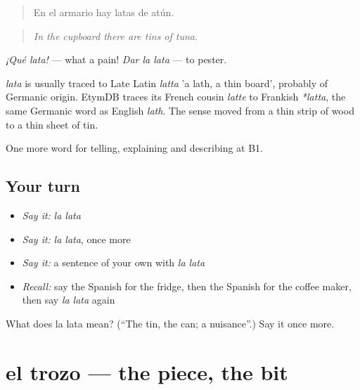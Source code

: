\begin{quote}
En el armario hay latas de atún.
\end{quote}

\begin{quote}
\emph{In the cupboard there are tins of tuna.}
\end{quote}

\emph{¡Qué lata!} — what a pain! \emph{Dar la lata} — to pester.

\begin{cousinweb}
\emph{lata} is usually traced to Late Latin \emph{latta} 'a lath, a thin board', probably of Germanic origin. EtymDB traces its French cousin \emph{latte} to Frankish \emph{*latta}, the same Germanic word as English \emph{lath}. The sense moved from a thin strip of wood to a thin sheet of tin.
\end{cousinweb}

\begin{grammarlens}[title={What you've built}]
One more word for telling, explaining and describing at B1.
\end{grammarlens}

\subsection*{Your turn}
\begin{itemize}
\raggedright
  \item \emph{Say it:} \emph{la lata}
  \item \emph{Say it:} \emph{la lata}, once more
  \item \emph{Say it:} a sentence of your own with \emph{la lata}
  \item \emph{Recall:} say the Spanish for the fridge, then the Spanish for the coffee maker, then say \emph{la lata} again
\end{itemize}

\begin{tcolorbox}[breakable,colback=teal!4,colframe=teal!35!black,title={Before you move on}]
What does la lata mean? (\textquotedblleft{}The tin, the can; a nuisance\textquotedblright{}.) Say it once more.
\end{tcolorbox}
\section[el trozo]{el trozo — the piece, the bit}

\label{lesson:ES-C775-trozo}



